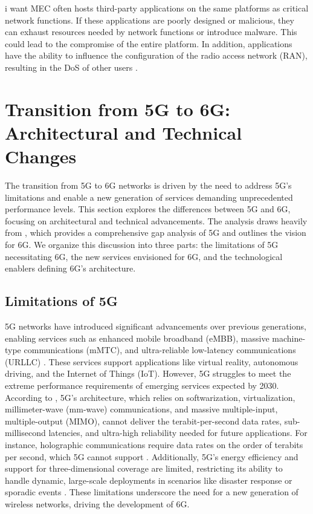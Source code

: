 \documentclass[acmtog]{acmart}
\begin{document}
i want MEC often hosts third-party applications on the same platforms as critical network functions. If these applications are poorly designed or malicious, they can exhaust resources needed by network functions or introduce malware. This could lead to the compromise of the entire platform. In addition, applications have the ability to influence the configuration of the radio access network (RAN), resulting in the DoS of other users \cite{ref3_3}.

\section{Transition from 5G to 6G: Architectural and Technical Changes}

The transition from 5G to 6G networks is driven by the need to address 5G's limitations and enable a new generation of services demanding unprecedented performance levels. This section explores the differences between 5G and 6G, focusing on architectural and technical advancements. The analysis draws heavily from \citet{ref4}, which provides a comprehensive gap analysis of 5G and outlines the vision for 6G. We organize this discussion into three parts: the limitations of 5G necessitating 6G, the new services envisioned for 6G, and the technological enablers defining 6G's architecture.

\subsection{Limitations of 5G}

5G networks have introduced significant advancements over previous generations, enabling services such as enhanced mobile broadband (eMBB), massive machine-type communications (mMTC), and ultra-reliable low-latency communications (URLLC) \citep{ref4}. These services support applications like virtual reality, autonomous driving, and the Internet of Things (IoT). However, 5G struggles to meet the extreme performance requirements of emerging services expected by 2030. According to \citet{ref4}, 5G's architecture, which relies on softwarization, virtualization, millimeter-wave (mm-wave) communications, and massive multiple-input, multiple-output (MIMO), cannot deliver the terabit-per-second data rates, sub-millisecond latencies, and ultra-high reliability needed for future applications. For instance, holographic communications require data rates on the order of terabits per second, which 5G cannot support \citep{ref4_1}. Additionally, 5G's energy efficiency and support for three-dimensional coverage are limited, restricting its ability to handle dynamic, large-scale deployments in scenarios like disaster response or sporadic events \citep{ref4}. These limitations underscore the need for a new generation of wireless networks, driving the development of 6G.
\end{document}
